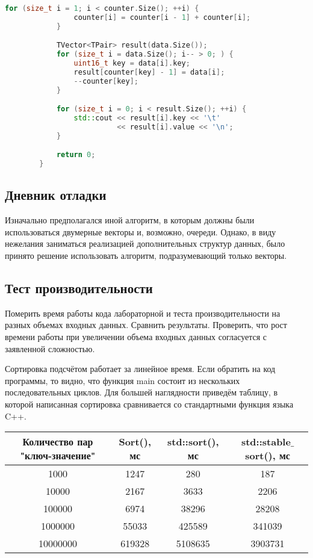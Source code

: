 \documentclass[12pt]{article}
\begin{document}
\begin{itemize}
\begin{lstlisting}[language=C++]
            for (size_t i = 1; i < counter.Size(); ++i) {
                counter[i] = counter[i - 1] + counter[i];
            }

            TVector<TPair> result(data.Size());
            for (size_t i = data.Size(); i-- > 0; ) {
                uint16_t key = data[i].key;
                result[counter[key] - 1] = data[i];
                --counter[key];
            }

            for (size_t i = 0; i < result.Size(); ++i) {
                std::cout << result[i].key << '\t'
                          << result[i].value << '\n';
            }

            return 0;
        }
        \end{lstlisting}
\end{itemize}

\subsection*{Дневник отладки}

Изначально предполагался иной алгоритм, в которым должны были использоваться двумерные векторы и, возможно, очереди. Однако, в виду нежелания заниматься реализацией дополнительных структур данных, было принято решение использовать алгоритм, подразумевающий только векторы.

\subsection*{Тест производительности}

Померить время работы кода лабораторной и теста производительности
на разных объемах входных данных. Сравнить результаты. Проверить,
что рост времени работы при увеличении объема входных данных
согласуется с заявленной сложностью.

Сортировка подсчётом работает за линейное время. Если обратить на код программы, то видно, что функция main состоит из нескольких последовательных циклов. Для большей наглядности приведём таблицу, в которой написанная сортировка сравнивается со стандартными функция языка C++.

\begin{center}
\begin{tabular}{ |c|c|c|c| }
    \hline
    Количество пар "ключ-значение" & Sort(), мс & std::sort(), мс & std::stable$\_$sort(), мс \\
    \hline
    1000 & 1247 & 280 & 187 \\
    10000 & 2167 & 3633 & 2206 \\
    100000 & 6974 & 38296 & 28208 \\
    1000000 & 55033 & 425589 & 341039 \\
    10000000 & 619328 & 5108635 & 3903731 \\
    \hline
    \end{tabular}
\end{center}
\end{document}

